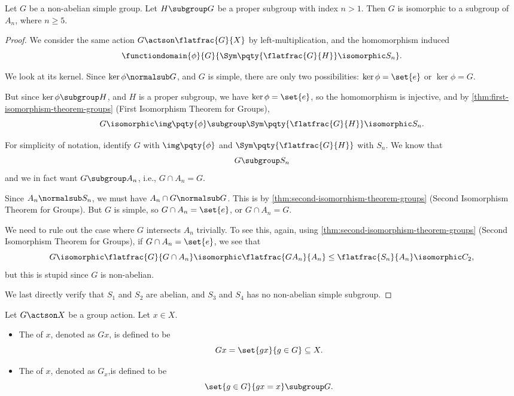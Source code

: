 \begin{corollary}
    \label{cor:non-abelian-simple-group}%
    Let \(G\) be a non-abelian simple group. Let \(H \subgroup G\) be a proper subgroup with index \(n > 1\). Then \(G\) is isomorphic to a subgroup of \(A_n\), where \(n \geq 5\).
\end{corollary}

\begin{proof}
    We consider the same action \(G \actson \flatfrac{G}{X}\) by left-multiplication, and the homomorphism induced
    \[
        \functiondomain{\phi}{G}{\Sym\pqty{\flatfrac{G}{H}} \isomorphic S_n}.
    \]

    We look at its kernel. Since \(\ker \phi \normalsub G\), and \(G\) is simple, there are only two possibilities: \(\ker \phi = \set{e}\) or \(\ker \phi = G\).

    But since \(\ker \phi \subgroup H\), and \(H\) is a proper subgroup, we have \(\ker \phi = \set{e}\), so the homomorphism is injective, and by \autoref{thm:first-isomorphism-theorem-groups} (First Isomorphism Theorem for Groups),
    \[
        G \isomorphic \img \pqty{\phi} \subgroup \Sym\pqty{\flatfrac{G}{H}} \isomorphic S_n.
    \]

    For simplicity of notation, identify \(G\) with \(\img \pqty{\phi}\) and \(\Sym\pqty{\flatfrac{G}{H}}\) with \(S_n\). We know that
    \[
        G \subgroup S_n
    \]
    and we in fact want \(G \subgroup A_n\), i.e., \(G \cap A_n = G\).

    Since \(A_n \normalsub S_n\), we must have \(A_n \cap G \normalsub G\). This is by \autoref{thm:second-isomorphism-theorem-groups} (Second Isomorphism Theorem for Groups). But \(G\) is simple, so \(G \cap A_n = \set{e}\), or \(G \cap A_n = G\).

    We need to rule out the case where \(G\) intersects \(A_n\) trivially. To see this, again, using \autoref{thm:second-isomorphism-theorem-groups} (Second Isomorphism Theorem for Groups), if \(G \cap A_n = \set{e}\), we see that
    \[
        G \isomorphic \flatfrac{G}{G \cap A_n} \isomorphic \flatfrac{G A_n}{A_n} \leq \flatfrac{S_n}{A_n} \isomorphic C_2,
    \]
    but this is stupid since \(G\) is non-abelian.

    We last directly verify that \(S_1\) and \(S_2\) are abelian, and \(S_3\) and \(S_4\) has no non-abelian simple subgroup.
\end{proof}

\begin{definition}
    \label{def:orbits-stablisers}%
    Let \(G \actson X\) be a group action. Let \(x \in X\).
    
    \begin{itemize}
        \item The  of \(x\), denoted as \(G x\), is defined to be
        \[
            G x = \set{gx}{g \in G} \subseteq X.
        \]
        \item The   of \(x\), denoted as \(G_x\),is defined to be
        \[
            \set{g \in G}{gx = x} \subgroup G.
        \]
    \end{itemize}
\end{definition}

